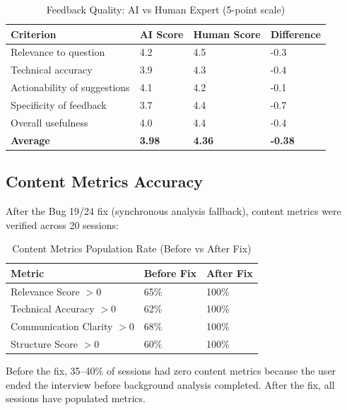 \begin{table}[H]
\centering
\caption{Feedback Quality: AI vs Human Expert (5-point scale)}
\vspace{8pt}
\begin{tabularx}{\textwidth}{|X|C{2.5cm}|C{2.5cm}|C{2.5cm}|}
\hline
\textbf{Criterion} & \textbf{AI Score} & \textbf{Human Score} & \textbf{Difference} \\
\hline
Relevance to question & 4.2 & 4.5 & -0.3 \\
\hline
Technical accuracy & 3.9 & 4.3 & -0.4 \\
\hline
Actionability of suggestions & 4.1 & 4.2 & -0.1 \\
\hline
Specificity of feedback & 3.7 & 4.4 & -0.7 \\
\hline
Overall usefulness & 4.0 & 4.4 & -0.4 \\
\hline
\textbf{Average} & \textbf{3.98} & \textbf{4.36} & \textbf{-0.38} \\
\hline
\end{tabularx}
\label{tab:feedbackresults}
\end{table}

\subsection{Content Metrics Accuracy}

After the Bug 19/24 fix (synchronous analysis fallback), content metrics were verified across 20 sessions:

\begin{table}[H]
\centering
\caption{Content Metrics Population Rate (Before vs After Fix)}
\vspace{8pt}
\begin{tabularx}{\textwidth}{|X|C{3cm}|C{3cm}|}
\hline
\textbf{Metric} & \textbf{Before Fix} & \textbf{After Fix} \\
\hline
Relevance Score $> 0$ & 65\% & 100\% \\
\hline
Technical Accuracy $> 0$ & 62\% & 100\% \\
\hline
Communication Clarity $> 0$ & 68\% & 100\% \\
\hline
Structure Score $> 0$ & 60\% & 100\% \\
\hline
\end{tabularx}
\label{tab:metricsfix}
\end{table}

Before the fix, 35--40\% of sessions had zero content metrics because the user ended the interview before background analysis completed. After the fix, all sessions have populated metrics.


